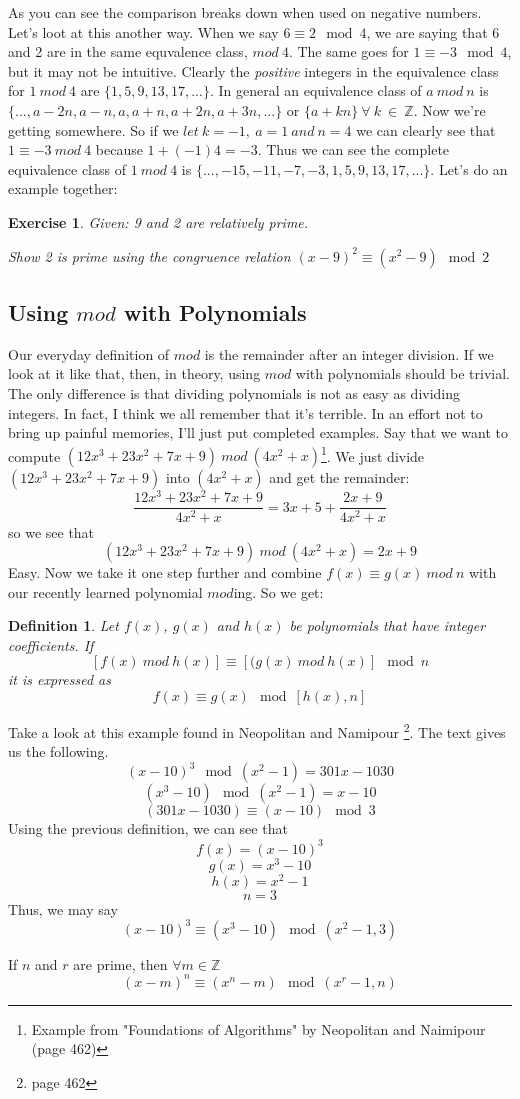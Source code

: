 \documentclass[11pt]{article}
\newtheorem{ex}{Exercise}
\newtheorem{definition}{Definition}
\begin{document}
As you can see the comparison breaks down when used on negative numbers. Let's loot at this another way. When we say $6 \equiv 2 \mod 4$, we are saying that 6 and 2 are in the same equvalence class, $mod\ 4$. The same goes for $1 \equiv-3 \mod 4$, but it may not be intuitive. Clearly the \emph{positive} integers in the equivalence class for $1\ mod\ 4$ are $\{1,5,9,13,17,...\}$. In general an equivalence class of $a\ mod\ n$ is $\{...,a-2n,a-n,a,a+n,a+2n,a+3n,...\}$ or $\{a+kn\}\ \forall\ k\ \in\ \mathbb{Z}$. Now we're getting somewhere. So if we $let\ k = -1,\ a = 1\ and\ n = 4$ we can clearly see that $1 \equiv -3\ mod\ 4$ because $1+(-1)4=-3$. Thus we can see the complete equivalence class of $1\ mod\ 4$ is $\{...,-15,-11,-7,-3,1,5,9,13,17,...\}$. Let's do an example together:

\begin{ex}
Given: 9 and 2 are relatively prime.

Show 2 is prime using the congruence relation $(x-9)^2 \equiv (x^2-9) \mod 2 $
\end{ex}
\vspace{10pc}
\subsection{Using $mod$ with Polynomials}
Our everyday definition of $mod$ is the remainder after an integer division. If we look at it like that, then, in theory, using $mod$ with polynomials should be trivial. The only difference is that dividing polynomials is not as easy as dividing integers. In fact, I think we all remember that it's terrible. In an effort not to bring up painful memories, I'll just put completed examples. Say that we want to compute $ (12x^3+23x^2+7x+9)\ mod\ (4x^2+x) $\footnote{Example from "Foundations of Algorithms" by Neopolitan and Naimipour (page 462)}. We just divide $ (12x^3+23x^2+7x+9)$ into $(4x^2+x)$ and get the remainder:
$$
\frac{12x^3+23x^2+7x+9}{4x^2+x}=3x+5+\frac{2x+9}{4x^2+x}
$$
so we see that
$$
(12x^3+23x^2+7x+9)\ mod\ (4x^2+x)=2x+9
$$
Easy. Now we take it one step further and combine $f(x) \equiv g(x)\ mod\ n$ with our recently learned polynomial $mod$ing. So we get:
\begin{definition}
Let $f(x)$, $g(x)$ and $h(x)$ be polynomials that have integer coefficients. If $$[f(x)\ mod\ h(x)] \equiv [(g(x)\ mod\ h(x)] \mod n$$ it is expressed as $$ f(x) \equiv g(x) \mod [h(x),n]$$
\end{definition}

Take a look at this example found in Neopolitan and Namipour \footnote{page 462}. The text gives us the following.
$$(x-10)^3 \mod (x^2-1) = 301x-1030 $$
$$(x^3-10) \mod (x^2-1) = x-10$$
$$(301x-1030) \equiv (x-10) \mod 3$$
Using the previous definition, we can see that
$$f(x) = (x-10)^3$$
$$g(x) = x^3-10$$
$$h(x) = x^2-1$$
$$n=3$$
Thus, we may say
$$(x-10)^3 \equiv (x^3-10) \mod (x^2-1,3)$$
\begin{thm}{If $n$ and $r$ are prime, then $\forall{m\in{\mathbb{Z}}}$}
\begin{equation}
(x-m)^n \equiv (x^n -m) \mod (x^r-1,n)
\end{equation}
\end{thm}
\end{document}
